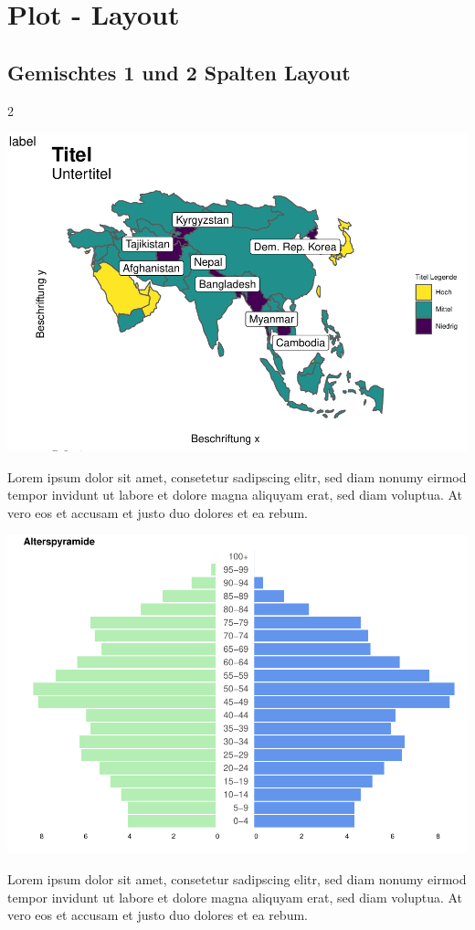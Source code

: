 \documentclass[
]{article}
\begin{document}
\newpage

\hypertarget{plot---layout}{%
\section{Plot - Layout}\label{plot---layout}}

\hypertarget{gemischtes-1-und-2-spalten-layout}{%
\subsection{Gemischtes 1 und 2 Spalten
Layout}\label{gemischtes-1-und-2-spalten-layout}}

\begin {multicols}{2}

\includegraphics{ggplot2_files/figure-latex/unnamed-chunk-9-1.pdf}

Lorem ipsum dolor sit amet, consetetur sadipscing elitr, sed diam nonumy
eirmod tempor invidunt ut labore et dolore magna aliquyam erat, sed diam
voluptua. At vero eos et accusam et justo duo dolores et ea rebum.

\columnbreak

\includegraphics{ggplot2_files/figure-latex/unnamed-chunk-10-1.pdf}

Lorem ipsum dolor sit amet, consetetur sadipscing elitr, sed diam nonumy
eirmod tempor invidunt ut labore et dolore magna aliquyam erat, sed diam
voluptua. At vero eos et accusam et justo duo dolores et ea rebum.

\end {multicols}
\end{document}
